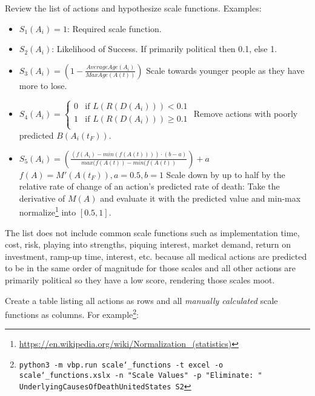 \documentclass[12pt, a4paper, twocolumn]{article}
\begin{document}
Review the list of actions and hypothesize scale functions. Examples:

\begin{itemize}
\item $S_1(A_i) = 1$: Required scale function.
\item $S_2(A_i)$: Likelihood of Success. If primarily political then 0.1, else 1.
\item $S_3(A_i) = \left(1 - \frac{AverageAge(A_i)}{MaxAge(A(t))}\right)$
                \newline\newline
                Scale towards younger people as they have more to lose.
\item $S_4(A_i) = \begin{cases}\text{0} & \mbox{if } L(R(D(A_i))) < 0.1 \\ \text{1} & \mbox{if } L(R(D(A_i))) \ge 0.1 \\ \end{cases}$
                \newline\newline
                Remove actions with poorly predicted $B(A_i(t_F))$.
\item $S_5(A_i) = \left(\frac{(f(A_i)-min(f(A(t)))) \cdot (b-a)}{max(f(A(t))-min(f(A(t))}\right) + a$
                \newline\newline
                $f(A) = M'(A(t_F)), a=0.5, b=1$
                \newline\newline
                Scale down by up to half by the relative rate of change of an action's predicted rate of death: Take the derivative of $M(A)$ and evaluate it with the predicted value and min-max normalize\footnote{\url{https://en.wikipedia.org/wiki/Normalization_(statistics)}} into $[0.5,1]$.
\end{itemize}

The list does not include common scale functions such as implementation time, cost, risk, playing into strengths, piquing interest, market demand, return on investment, ramp-up time, interest, etc. because all medical actions are predicted to be in the same order of magnitude for those scales and all other actions are primarily political so they have a low score, rendering those scales moot.

Create a table listing all actions as rows and all \textit{manually calculated} scale functions as columns. For example\footnote{\texttt{python3 -m vbp.run scale\char`_functions -t excel -o scale\char`_functions.xslx -n "Scale Values" -p "Eliminate: " UnderlyingCausesOfDeathUnitedStates S2}}:
\end{document}
